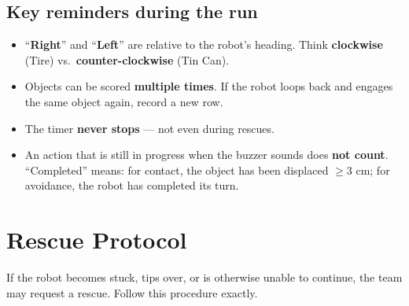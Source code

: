\documentclass[a4]{article}
\begin{document}
\subsection*{Key reminders during the run}

\begin{itemize}
    \item ``\textbf{Right}'' and ``\textbf{Left}'' are relative to the robot's heading. Think \textbf{clockwise} (Tire) vs.\ \textbf{counter-clockwise} (Tin Can).
    \item Objects can be scored \textbf{multiple times}. If the robot loops back and engages the same object again, record a new row.
    \item The timer \textbf{never stops} --- not even during rescues.
    \item An action that is still in progress when the buzzer sounds does \textbf{not count}. ``Completed'' means: for contact, the object has been displaced $\geq$3 cm; for avoidance, the robot has completed its turn.
\end{itemize}

\pagebreak
\section*{Rescue Protocol}

If the robot becomes stuck, tips over, or is otherwise unable to continue, the team may request a rescue. Follow this procedure exactly.
\end{document}
